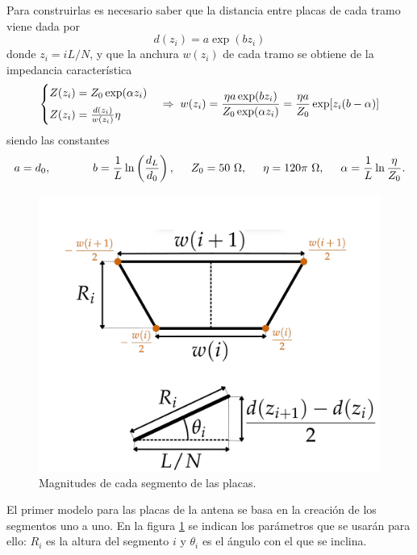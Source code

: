 \documentclass[11pt,a4paper,twoside,pdf]{article}
\numberwithin{equation}{section}
\begin{document}
Para construirlas es necesario saber que la distancia entre placas de cada tramo viene dada por
\begin{equation}\label{eq:d(z)}
    d(z_i) = a\exp{(bz_i)}
\end{equation}
donde $z_i=iL/N$, y que la anchura $w(z_i)$ de cada tramo se obtiene de la impedancia característica
\begin{equation}\label{eq:w}
    \begin{cases}
        Z(z_i) = Z_0\exp (\alpha z_i)\\[5pt]
        Z(z_i) = \frac{d(z_i)}{w(z_i)}\eta
    \end{cases}
    \Rightarrow\hspace{0.1cm} w(z_i) = \frac{\eta a\exp (bz_i)}{Z_0\exp(\alpha z_i)} = \frac{\eta a}{Z_0}\exp [z_i(b-\alpha)]
\end{equation}
\noindent siendo las constantes
\begin{equation}
    a = d_0, \hspace{1.3cm} b=\frac{1}{L}\ln\left(\frac{d_L}{d_0}\right), \hspace{0.5cm}Z_0=50\text{ }\Omega, \hspace{0.5cm} \eta = 120\pi\text{ }\Omega, \hspace{0.5cm}\alpha = \frac{1}{L}\ln \frac{\eta}{Z_0}.
\end{equation}
\begin{figure}
    \vspace{-0.7cm}
    \includegraphics[width=\linewidth]{img/modelos/2025_02_20-Placas/schmPlacas.png}
    \caption{Magnitudes de cada segmento de las placas.}
    \label{fig:schmPlacas}
\end{figure}
El primer modelo para las placas de la antena se basa en la creación de los segmentos uno a uno. En la figura \ref{fig:schmPlacas} se indican los parámetros que se usarán para ello: $R_i$ es la altura del segmento $i$ y $\theta_i$ es el ángulo con el que se inclina.\\
\end{document}
